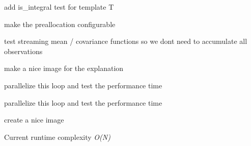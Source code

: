 
\begin{DoxyRefList}
\item[\label{todo__todo000003}%
\Hypertarget{todo__todo000003}%
Class \hyperlink{classclara_1_1cone__state}{clara\+:\+:cone\+\_\+state$<$ T $>$} ]add {\ttfamily is\+\_\+integral} test for template {\ttfamily T}  
\item[\label{todo__todo000009}%
\Hypertarget{todo__todo000009}%
Member \hyperlink{classclara_1_1cone__state_ae5c8c1ba05533a80ab1874fb878888b9}{clara\+:\+:cone\+\_\+state$<$ T $>$\+:\+:\+\_\+observations} ]make the preallocation configurable  
\item[\label{todo__todo000004}%
\Hypertarget{todo__todo000004}%
Member \hyperlink{classclara_1_1cone__state_a7cd7364ca787c25b0ca333d0cb1c3081}{clara\+:\+:cone\+\_\+state$<$ T $>$\+:\+:add\+\_\+observation} (T x, T y)]test streaming mean / covariance functions so we don\textquotesingle{}t need to accumulate all observations  
\item[\label{todo__todo000005}%
\Hypertarget{todo__todo000005}%
Member \hyperlink{classclara_1_1cone__state_ae3ea1ca7a6af262f71493f45c0734322}{clara\+:\+:cone\+\_\+state$<$ T $>$\+:\+:is\+\_\+used} ()]
\item[\label{todo__todo000006}%
\Hypertarget{todo__todo000006}%
Member \hyperlink{classclara_1_1cone__state_a90b1ae9171e6196c19da0d883a8c2fdb}{clara\+:\+:cone\+\_\+state$<$ T $>$\+:\+:pdf} (T x, T y)]make a nice image for the explanation 
\item[\label{todo__todo000008}%
\Hypertarget{todo__todo000008}%
Member \hyperlink{classclara_1_1cone__state_a946bca664d068d7a82e3740eb736e948}{clara\+:\+:cone\+\_\+state$<$ T $>$\+:\+:update\+\_\+cov\+\_\+mat} ()]parallelize this loop and test the performance time  
\item[\label{todo__todo000007}%
\Hypertarget{todo__todo000007}%
Member \hyperlink{classclara_1_1cone__state_ada683dbedcee79d84db8255ee5e71e6e}{clara\+:\+:cone\+\_\+state$<$ T $>$\+:\+:update\+\_\+mean\+\_\+vec} ()]parallelize this loop and test the performance time  
\item[\label{todo__todo000010}%
\Hypertarget{todo__todo000010}%
Class \hyperlink{classclara_1_1data__association}{clara\+:\+:data\+\_\+association$<$ T $>$} ]create a nice image 
\item[\label{todo__todo000012}%
\Hypertarget{todo__todo000012}%
Member \hyperlink{classclara_1_1data__association_aa6fa8a0a838466029189534c94ce1443}{clara\+:\+:data\+\_\+association$<$ T $>$\+:\+:\+\_\+max\+\_\+dist\+\_\+btw\+\_\+cones\+\_\+m} ]
\item[\label{todo__todo000011}%
\Hypertarget{todo__todo000011}%
Member \hyperlink{classclara_1_1data__association_a0107c7f137ed245fec1818aa9c7f63d5}{clara\+:\+:data\+\_\+association$<$ T $>$\+:\+:get\+\_\+cone\+\_\+count\+\_\+all} ()]Current runtime complexity {\itshape O(\+N)} 
\end{DoxyRefList}